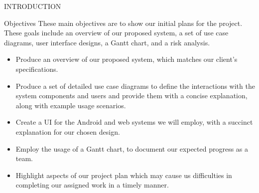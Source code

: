\documentclass{article}
\begin{document}
\begin{section}{INTRODUCTION}
		\begin{subsection}{Objectives}
			These main objectives are to show our initial plans for the project. These goals include an overview of our proposed system, a set of use case diagrams, user interface designs, a Gantt chart, and a risk analysis.
			
			\begin{itemize}
				\item{Produce an overview of our proposed system, which matches our client's specifications.}
				\item{Produce a set of detailed use case diagrams to define the interactions with the system components and users and provide them with a concise explanation, along with example usage scenarios.}
				\item{Create a UI for the Android and web systems we will employ, with a succinct explanation for our chosen design.}
				\item{Employ the usage of a Gantt chart, to document our expected progress as a team.}
				\item{Highlight aspects of our project plan which may cause us difficulties in completing our assigned work in a timely manner.}
			\end{itemize}
		\end{subsection}
	\end{section}
\end{document}
